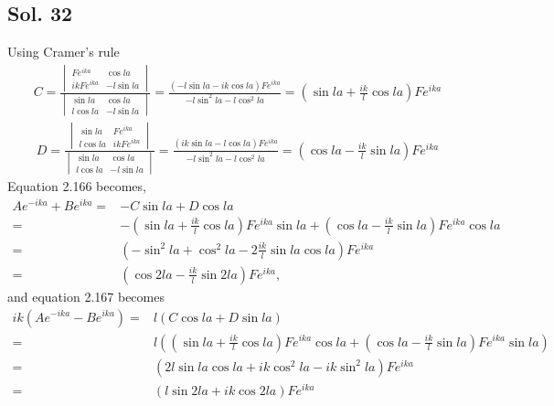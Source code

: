     \subsection*{Sol. 32}
    Using Cramer's rule 
    \begin{align*}
        C = \frac{
        \begin{vmatrix}
        Fe^{ika} & \cos la\\
        ikFe^{ika} & -l\sin la
        \end{vmatrix}
        }{\begin{vmatrix}
        \sin la & \cos la\\
        l\cos la & -l\sin la
        \end{vmatrix}}
        =
        \frac{(-l\sin la-ik\cos la)Fe^{ika}}
        {-l\sin^2la-l\cos^2la}
        =(\sin la+\frac{ik}{l}\cos la)Fe^{ika}
    \end{align*}
    \begin{align*}
        D = \frac{
        \begin{vmatrix}
        \sin la & Fe^{ika} \\
        l\cos la & ikFe^{ika} 
        \end{vmatrix}
        }{\begin{vmatrix}
        \sin la & \cos la\\
        l\cos la & -l\sin la
        \end{vmatrix}}
        =
        \frac{(ik\sin la-l\cos la)Fe^{ika}}
        {-l\sin^2la-l\cos^2la}
        =(\cos la-\frac{ik}{l}\sin la)Fe^{ika}
    \end{align*}
    Equation 2.166 becomes,
    \begin{align*}
        Ae^{-ika} + Be^{ika} 
        = &  -C\sin la + D\cos la\\
         = & -(\sin la+\frac{ik}{l}\cos la)Fe^{ika}\sin la + 
         (\cos la-\frac{ik}{l}\sin la)Fe^{ika}\cos la\\
         = & (-\sin^2la+\cos^2la-2\frac{ik}{l}\sin la\cos la)Fe^{ika}\\
         = & (\cos 2la -\frac{ik}{l}\sin 2la)Fe^{ika},
    \end{align*}
    and 
    equation 2.167 becomes
    \begin{align*}
        ik(Ae^{-ika} - Be^{ika} )
        = &  l(C\cos la + D\sin la)\\
         = & l((\sin la+\frac{ik}{l}\cos la)Fe^{ika}\cos la + 
         (\cos la-\frac{ik}{l}\sin la)Fe^{ika}
         \sin la)\\
         = & (2l\sin la\cos la + ik\cos^2la -ik \sin^2la)Fe^{ika} \\
         =& (l\sin 2la +ik\cos2la)Fe^{ika}
    \end{align*}
